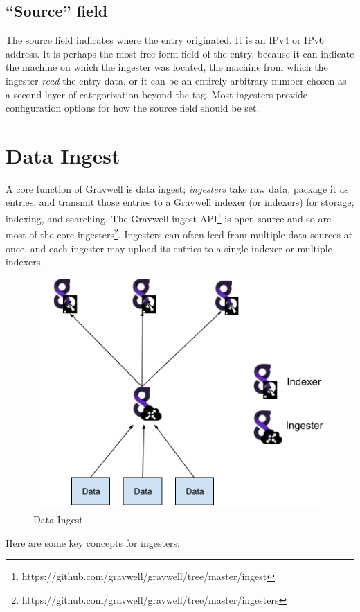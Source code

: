 \subsection{``Source'' field}

The source field indicates where the entry originated. It is an IPv4 or IPv6 address. It is perhaps the most free-form field of the entry, because it can indicate the machine on which the ingester was located, the machine from which the ingester \emph{read} the entry data, or it can be an entirely arbitrary number chosen as a second layer of categorization beyond the tag. Most ingesters provide configuration options for how the source field should be set.

\clearpage
\section{Data Ingest}

A core function of Gravwell is data ingest; \emph{ingesters} take raw data, package it as entries,
and transmit those entries to a Gravwell indexer (or
indexers) for storage, indexing, and searching. The Gravwell
ingest API\footnote{https://github.com/gravwell/gravwell/tree/master/ingest}
is open source and so are most of the core
ingesters\footnote{https://github.com/gravwell/gravwell/tree/master/ingesters}.  Ingesters can
often feed from multiple data sources at once, and each ingester may
upload its entries to a single indexer or multiple indexers.


\begin{figure}
	\includegraphics[width=0.6\linewidth]{images/dataingest.png}
	\caption{Data Ingest}
\end{figure}

Here are some key concepts for ingesters:


